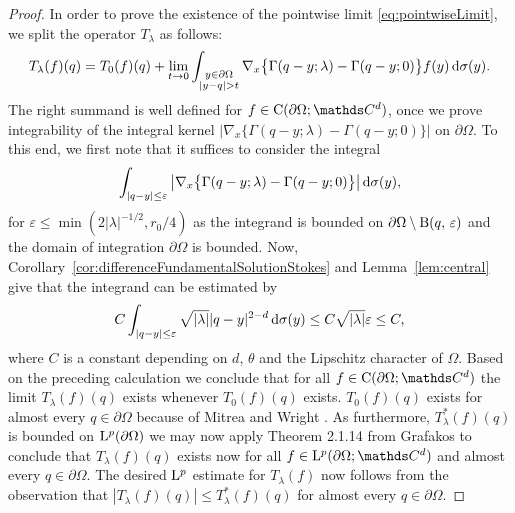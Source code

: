 \begin{proof}
   In order to prove the existence of the pointwise limit \eqref{eq:pointwiseLimit},  we split the operator $T_\lambda$ as follows:
   \begin{align*}
     T_\lambda(f)(q) = T_0(f)(q) + \lim_{t \to 0} \int_{\substack{y \in \partial\Omega \\ |y - q| > t}} \nabla_x \big\{ \Gamma(q - y; \lambda) - \Gamma(q - y; 0)\big\}  f(y) \, {\operatorname{d}\!{\sigma}}(y).
   \end{align*}
   The right summand is well defined for $f \in \CC(\partial\Omega; \C^d)$, once we prove integrability of the integral kernel $\big|\nabla_x \big\{\Gamma(q - y; \lambda) - \Gamma(q - y; 0)\big\} \big|$ on $\partial\Omega$.
   To this end, we first note that it suffices to consider the integral
   \begin{align*}
     \int_{|q - y| \leq \varepsilon} \big| \nabla_x\big\{ \Gamma(q - y; \lambda) - \Gamma(q - y; 0) \big\} \big| \, {\operatorname{d}\!{\sigma}}(y), 
   \end{align*}
   for $\varepsilon \leq \min(2|\lambda|^{-1/2}, r_0/4)$ as the integrand is bounded on $\partial\Omega \setminus \mathrm{B}(q,\,\varepsilon)$  and the domain of integration $\partial\Omega$ is bounded.
   Now, Corollary~\ref{cor:differenceFundamentalSolutionStokes} and Lemma~\ref{lem:central} give that the integrand can be estimated by
   \begin{align*}
     C \int_{|q - y| \leq \varepsilon} \sqrt{|\lambda|} |q - y|^{2 - d} \, {\operatorname{d}\!{\sigma}}(y) \leq C \sqrt{|\lambda|} \varepsilon \leq C,
   \end{align*}
   where $C$ is a constant depending on $d$, $\theta$ and the Lipschitz character of $\Omega$.
   Based on the preceding calculation we conclude that for all $f \in \CC(\partial\Omega; \C^d)$ the limit $T_\lambda(f)(q)$ exists whenever $T_0(f)(q)$ exists.
   $T_0(f)(q)$ exists for almost every $q \in \partial\Omega$ because of Mitrea and Wright \cite{mitreaWright}.
   As furthermore, $T_\lambda^*(f)(q)$ is bounded on $\mathrm{L}^p(\partial\Omega)$  we may now apply Theorem 2.1.14 from Grafakos \cite{grafakos2014classical} to conclude that $T_\lambda(f)(q)$ exists now for all $f \in \Ell^p(\partial\Omega; \C^d)$ and almost every $q \in \partial\Omega$.
   The desired $\mathrm{L}^p$ estimate for $T_\lambda(f)$ now follows from the observation that $| T_\lambda(f)(q) | \leq T_\lambda^*(f)(q)$ for almost every $q \in \partial\Omega$.
\end{proof}

